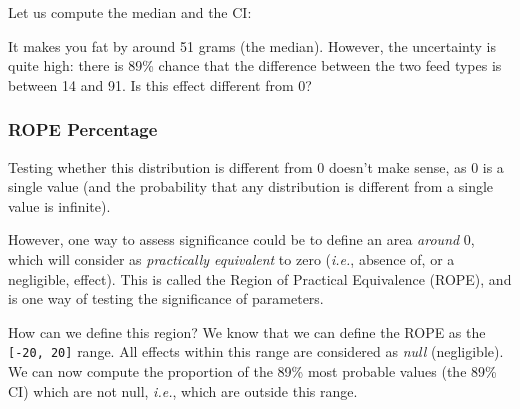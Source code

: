 \documentclass[10pt,a4paper,onecolumn]{article}
\newenvironment{Shaded}{\begin{snugshade}}{\end{snugshade}}
\newcommand{\AttributeTok}[1]{\textcolor[rgb]{0.77,0.63,0.00}{#1}}
\newcommand{\CommentTok}[1]{\textcolor[rgb]{0.56,0.35,0.01}{\textit{#1}}}
\newcommand{\DecValTok}[1]{\textcolor[rgb]{0.00,0.00,0.81}{#1}}
\newcommand{\FloatTok}[1]{\textcolor[rgb]{0.00,0.00,0.81}{#1}}
\newcommand{\FunctionTok}[1]{\textcolor[rgb]{0.00,0.00,0.00}{#1}}
\newcommand{\NormalTok}[1]{#1}
\newcommand{\SpecialCharTok}[1]{\textcolor[rgb]{0.00,0.00,0.00}{#1}}
\begin{document}
Let us compute the median and the CI:

\begin{Shaded}
\end{Shaded}

It makes you fat by around 51 grams (the median). However, the
uncertainty is quite high: there is 89\% chance that the difference
between the two feed types is between 14 and 91. Is this effect
different from 0?

\hypertarget{rope-percentage}{%
\subsubsection{ROPE Percentage}\label{rope-percentage}}

Testing whether this distribution is different from 0 doesn't make
sense, as 0 is a single value (and the probability that any distribution
is different from a single value is infinite).

However, one way to assess significance could be to define an area
\emph{around} 0, which will consider as \emph{practically equivalent} to
zero (\emph{i.e.}, absence of, or a negligible, effect). This is called
the Region of Practical Equivalence (ROPE), and is one way of testing
the significance of parameters.

How can we define this region? We know that we can define the ROPE as
the \texttt{{[}-20,\ 20{]}} range. All effects within this range are
considered as \emph{null} (negligible). We can now compute the
proportion of the 89\% most probable values (the 89\% CI) which are not
null, \emph{i.e.}, which are outside this range.

\begin{Shaded}
\end{Shaded}
\end{document}
